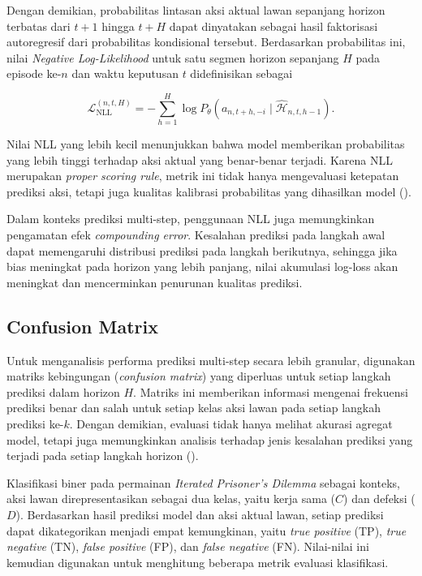 Dengan demikian, probabilitas lintasan aksi aktual lawan sepanjang horizon terbatas dari $t+1$ hingga $t+H$ dapat dinyatakan sebagai hasil faktorisasi autoregresif dari probabilitas kondisional tersebut. Berdasarkan probabilitas ini, nilai \textit{Negative Log-Likelihood} untuk satu segmen horizon sepanjang $H$ pada episode ke-$n$ dan waktu keputusan $t$ didefinisikan sebagai

\begin{equation}\label{eq:NLL}
\mathcal{L}_{\text{NLL}}^{(n,t,H)} 
= - \sum_{h=1}^{H} 
\log P_\theta(a_{n,t+h,-i} \mid \hat{\mathcal{H}}_{n,t,h-1}).
\end{equation}

\noindent
Nilai NLL yang lebih kecil menunjukkan bahwa model memberikan probabilitas yang lebih tinggi terhadap aksi aktual yang benar-benar terjadi. Karena NLL merupakan \textit{proper scoring rule}, metrik ini tidak hanya mengevaluasi ketepatan prediksi aksi, tetapi juga kualitas kalibrasi probabilitas yang dihasilkan model (\cite{zhu_negative_2018}).

Dalam konteks prediksi multi-step, penggunaan NLL juga memungkinkan pengamatan efek \textit{compounding error}. Kesalahan prediksi pada langkah awal dapat memengaruhi distribusi prediksi pada langkah berikutnya, sehingga jika bias meningkat pada horizon yang lebih panjang, nilai akumulasi log-loss akan meningkat dan mencerminkan penurunan kualitas prediksi.

\subsection{Confusion Matrix}

Untuk menganalisis performa prediksi multi-step secara lebih granular, digunakan matriks kebingungan (\textit{confusion matrix}) yang diperluas untuk setiap langkah prediksi dalam horizon $H$. Matriks ini memberikan informasi mengenai frekuensi prediksi benar dan salah untuk setiap kelas aksi lawan pada setiap langkah prediksi ke-$k$. Dengan demikian, evaluasi tidak hanya melihat akurasi agregat model, tetapi juga memungkinkan analisis terhadap jenis kesalahan prediksi yang terjadi pada setiap langkah horizon (\cite{sathyanarayanan_confusion_2024}).

Klasifikasi biner pada permainan \textit{Iterated Prisoner's Dilemma} sebagai konteks, aksi lawan direpresentasikan sebagai dua kelas, yaitu kerja sama ($C$) dan defeksi ($D$). Berdasarkan hasil prediksi model dan aksi aktual lawan, setiap prediksi dapat dikategorikan menjadi empat kemungkinan, yaitu \textit{true positive} (TP), \textit{true negative} (TN), \textit{false positive} (FP), dan \textit{false negative} (FN). Nilai-nilai ini kemudian digunakan untuk menghitung beberapa metrik evaluasi klasifikasi.

